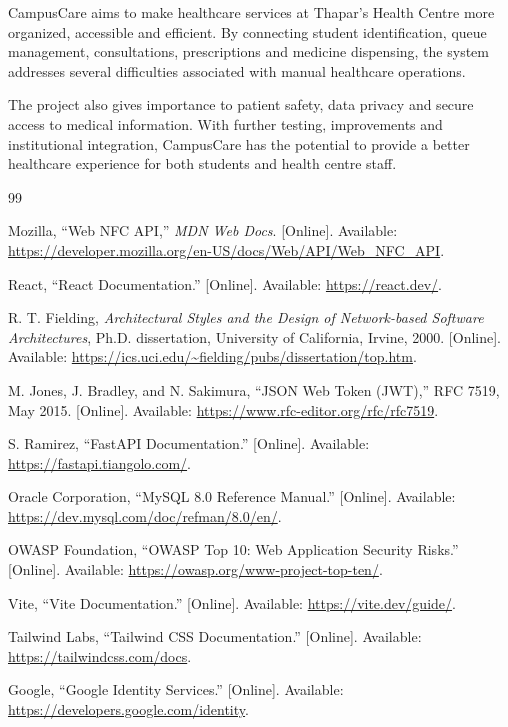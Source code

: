 \documentclass[a4paper,oneside,openany]{tietreport}
\begin{document}
CampusCare aims to make healthcare services at
Thapar's Health Centre more organized, accessible
and efficient. By connecting student identification,
queue management, consultations, prescriptions and
medicine dispensing, the system addresses several
difficulties associated with manual healthcare
operations.

The project also gives importance to patient safety,
data privacy and secure access to medical information.
With further testing, improvements and institutional
integration, CampusCare has the potential to provide
a better healthcare experience for both students
and health centre staff.
\renewcommand{\bibname}{References}
{}

\begin{thebibliography}{99}

Mozilla, ``Web NFC API,''
\textit{MDN Web Docs}.
[Online]. Available:
\url{https://developer.mozilla.org/en-US/docs/Web/API/Web_NFC_API}.

React, ``React Documentation.''
[Online]. Available:
\url{https://react.dev/}.

R. T. Fielding,
\textit{Architectural Styles and the Design of
Network-based Software Architectures},
Ph.D. dissertation, University of California,
Irvine, 2000.
[Online]. Available:
\url{https://ics.uci.edu/~fielding/pubs/dissertation/top.htm}.

M. Jones, J. Bradley, and N. Sakimura,
``JSON Web Token (JWT),''
RFC 7519, May 2015.
[Online]. Available:
\url{https://www.rfc-editor.org/rfc/rfc7519}.

S. Ramirez, ``FastAPI Documentation.''
[Online]. Available:
\url{https://fastapi.tiangolo.com/}.

Oracle Corporation, ``MySQL 8.0 Reference Manual.''
[Online]. Available:
\url{https://dev.mysql.com/doc/refman/8.0/en/}.

OWASP Foundation,
``OWASP Top 10: Web Application Security Risks.''
[Online]. Available:
\url{https://owasp.org/www-project-top-ten/}.

Vite, ``Vite Documentation.''
[Online]. Available:
\url{https://vite.dev/guide/}.

Tailwind Labs, ``Tailwind CSS Documentation.''
[Online]. Available:
\url{https://tailwindcss.com/docs}.

Google, ``Google Identity Services.''
[Online]. Available:
\url{https://developers.google.com/identity}.


\end{thebibliography}
\end{document}
